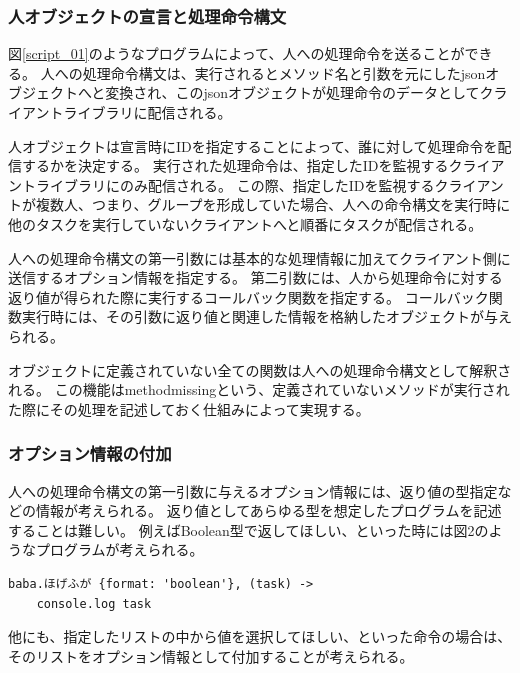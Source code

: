 \subsubsection{人オブジェクトの宣言と処理命令構文}\label{ux4ebaux30aaux30d6ux30b8ux30a7ux30afux30c8ux306eux5ba3ux8a00ux3068ux51e6ux7406ux547dux4ee4ux69cbux6587}

図\ref{script_01}のようなプログラムによって、人への処理命令を送ることができる。
人への処理命令構文は、実行されるとメソッド名と引数を元にしたjsonオブジェクトへと変換され、このjsonオブジェクトが処理命令のデータとしてクライアントライブラリに配信される。

人オブジェクトは宣言時にIDを指定することによって、誰に対して処理命令を配信するかを決定する。
実行された処理命令は、指定したIDを監視するクライアントライブラリにのみ配信される。
この際、指定したIDを監視するクライアントが複数人、つまり、グループを形成していた場合、人への命令構文を実行時に他のタスクを実行していないクライアントへと順番にタスクが配信される。

人への処理命令構文の第一引数には基本的な処理情報に加えてクライアント側に送信するオプション情報を指定する。
第二引数には、人から処理命令に対する返り値が得られた際に実行するコールバック関数を指定する。
コールバック関数実行時には、その引数に返り値と関連した情報を格納したオブジェクトが与えられる。

オブジェクトに定義されていない全ての関数は人への処理命令構文として解釈される。
この機能はmethodmissingという、定義されていないメソッドが実行された際にその処理を記述しておく仕組みによって実現する。

\subsubsection{オプション情報の付加}\label{ux30aaux30d7ux30b7ux30e7ux30f3ux60c5ux5831ux306eux4ed8ux52a0}

人への処理命令構文の第一引数に与えるオプション情報には、返り値の型指定などの情報が考えられる。
返り値としてあらゆる型を想定したプログラムを記述することは難しい。
例えばBoolean型で返してほしい、といった時には図2のようなプログラムが考えられる。

\begin{verbatim}
baba.ほげふが {format: 'boolean'}, (task) ->
    console.log task
\end{verbatim}

他にも、指定したリストの中から値を選択してほしい、といった命令の場合は、そのリストをオプション情報として付加することが考えられる。

